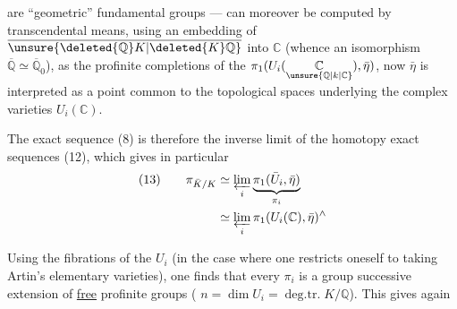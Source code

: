 are ``geometric'' fundamental groups ---  can moreover be computed by transcendental means, using an embedding of $\overline{\unsure{\deleted{\mathbb Q}K|\deleted{K}\mathbb Q}}$ into $\mathbb C$ (whence an isomorphism $\overline{\mathbb Q}\simeq\overline{\mathbb Q}_0$), as the profinite completions of the $\pi_1(U_i(\underset{\unsure{\mathbb Q|k|\mathbb C}}{\mathbb C}),\bar\eta)$,  now $\bar\eta$ is interpreted as a  point common to the topological spaces underlying the complex varieties $U_i(\mathbb C)$.

The exact sequence (8) is therefore the inverse limit of the homotopy exact sequences (12), which gives in particular
\[
\begin{aligned}
(13)\qquad \pi_{\bar K/K}&\simeq\varprojlim_i\underbrace{\pi_1(\bar U_i,\bar\eta)}_{\pi_i}\\
&\simeq\varprojlim_i\pi_1(U_i(\mathbb C),\bar\eta)^{\wedge}
\end{aligned}
\]

Using the fibrations of the $U_i$ (in the case where one restricts oneself to taking Artin's elementary varieties), one finds that every $\pi_i$ is a group  successive extension of  \uline{free} profinite groups ( $n=\dim U_i=\operatorname{deg.tr.}K/\mathbb Q$). This gives again
